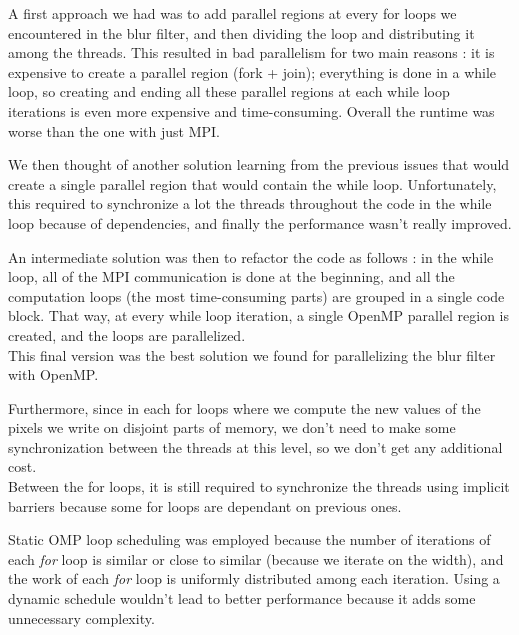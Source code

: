 \documentclass[11pt]{article}
\begin{document}
A first approach we had was to add parallel regions at every for loops we encountered in the blur filter, and then dividing the loop and distributing it among the threads. This resulted in bad parallelism for two main reasons : it is expensive to create a parallel region (fork + join); everything is done in a while loop, so creating and ending all these parallel regions at each while loop iterations is even more expensive and time-consuming. Overall the runtime was worse than the one with  just MPI. 

We  then thought of another solution learning from the previous issues that would create a single parallel region that would contain the while loop. Unfortunately, this required to synchronize a lot the threads throughout the code in the while loop because of dependencies, and finally the performance wasn't really improved. 

An intermediate solution was then to refactor the code as follows : in the while loop, all of the MPI communication is done at the beginning, and all the computation loops (the most time-consuming parts) are grouped in a single code block. That way, at every while loop iteration, a single OpenMP parallel region is created, and the loops are parallelized. \\
This final version was the best solution we found for parallelizing the blur filter with OpenMP.

Furthermore, since in each for loops where we compute the new values of the pixels we write on disjoint parts of memory, we don't need to make some synchronization between the threads at this level, so we don't get any additional cost. \\
Between the for loops, it is still required to synchronize the threads using implicit barriers because some for loops are dependant on previous ones. 

Static OMP loop scheduling was employed because the number of iterations of each \textit{for} loop is similar or close to similar (because we iterate on the width), and the work of each \textit{for} loop is uniformly distributed among each iteration. Using a dynamic schedule wouldn't lead to better performance because it adds some unnecessary complexity. \\
\end{document}
